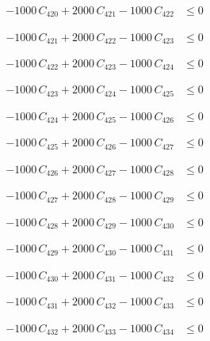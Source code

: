 \documentclass[a4paper,11pt]{article}
\begin{document}
\begin{align}
-1000\,C_{420} + 2000\,C_{421} - 1000\,C_{422} &\leq 0 \nonumber
\end{align}

\begin{align}
-1000\,C_{421} + 2000\,C_{422} - 1000\,C_{423} &\leq 0 \nonumber
\end{align}

\begin{align}
-1000\,C_{422} + 2000\,C_{423} - 1000\,C_{424} &\leq 0 \nonumber
\end{align}

\begin{align}
-1000\,C_{423} + 2000\,C_{424} - 1000\,C_{425} &\leq 0 \nonumber
\end{align}

\begin{align}
-1000\,C_{424} + 2000\,C_{425} - 1000\,C_{426} &\leq 0 \nonumber
\end{align}

\begin{align}
-1000\,C_{425} + 2000\,C_{426} - 1000\,C_{427} &\leq 0 \nonumber
\end{align}

\begin{align}
-1000\,C_{426} + 2000\,C_{427} - 1000\,C_{428} &\leq 0 \nonumber
\end{align}

\begin{align}
-1000\,C_{427} + 2000\,C_{428} - 1000\,C_{429} &\leq 0 \nonumber
\end{align}

\begin{align}
-1000\,C_{428} + 2000\,C_{429} - 1000\,C_{430} &\leq 0 \nonumber
\end{align}

\begin{align}
-1000\,C_{429} + 2000\,C_{430} - 1000\,C_{431} &\leq 0 \nonumber
\end{align}

\begin{align}
-1000\,C_{430} + 2000\,C_{431} - 1000\,C_{432} &\leq 0 \nonumber
\end{align}

\begin{align}
-1000\,C_{431} + 2000\,C_{432} - 1000\,C_{433} &\leq 0 \nonumber
\end{align}

\begin{align}
-1000\,C_{432} + 2000\,C_{433} - 1000\,C_{434} &\leq 0 \nonumber
\end{align}
\end{document}
